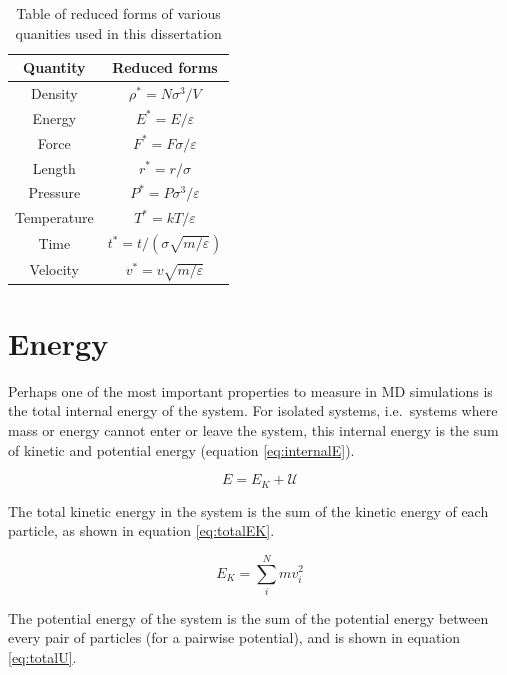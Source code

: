 \documentclass[12pt]{UoAthesis}
\begin{document}
\begin{table}[htp] 
  \caption{Table of reduced forms of various quanities used in this
    dissertation \cite{Haile1997}}
  \label{tab:reducedForms}
  \begin{center}
    \begin{tabular}{c c}
      \toprule
      Quantity & Reduced forms \\
      \midrule
      Density & $\rho^* = N \sigma^3 / V$ \\
      Energy & $E^* = E / \varepsilon$ \\
      Force & $F^* = F\sigma/\varepsilon$ \\
      Length & $r^* = r / \sigma$ \\
      Pressure & $P^* = P \sigma^3 /\varepsilon$ \\
      Temperature & $T^* = kT/\varepsilon$ \\
      Time & $t^* = t / (\sigma \sqrt{m/\varepsilon})$ \\
      Velocity & $v^* = v\sqrt{m/\varepsilon}$ \\
      \bottomrule
    \end{tabular}
  \end{center}
\end{table}

\section{Energy}
Perhaps one of the most important properties to measure in MD
simulations is the total internal energy of the system.  For isolated
systems, i.e.\ systems where mass or energy cannot enter or leave the
system, this internal energy is the sum of kinetic and potential
energy (equation \eqref{eq:internalE}).

\begin{equation}
  E = E_K + \mathcal{U} \label{eq:internalE}
\end{equation}

The total kinetic energy in the system is the sum of the kinetic
energy of each particle, as shown in equation \eqref{eq:totalEK}.

\begin{equation}
  \label{eq:totalEK}
  E_K = \sum_i^N mv_i^2
\end{equation}

The potential energy of the system is the sum of the potential energy
between every pair of particles (for a pairwise potential), and is
shown in equation \eqref{eq:totalU}.
\end{document}
